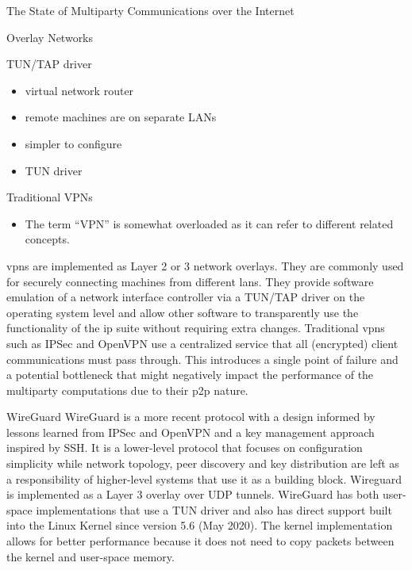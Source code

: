 \begin{frame}[fragile]{The State of Multiparty Communications over the
Internet}
\begin{block}{Overlay Networks}
\begin{block}{TUN/TAP driver}
\begin{itemize}
\begin{itemize}
    \begin{itemize}
    \tightlist
    \item
      virtual network router
    \item
      remote machines are on separate LANs
    \item
      simpler to configure
    \item
      TUN driver
    \end{itemize}
  \end{itemize}
\end{itemize}
\end{block}

\begin{block}{Traditional VPNs}
\protect\hypertarget{traditional-vpns}{}

\begin{itemize}
\tightlist
\item
  The term ``VPN'' is somewhat overloaded as it can refer to different
  related concepts.
\end{itemize}

\glspl{vpn} are implemented as Layer 2 or 3 network overlays. They are
commonly used for securely connecting machines from different
\glspl{lan}. They provide software emulation of a network interface
controller via a TUN/TAP driver on the operating system level and allow
other software to transparently use the functionality of the \gls{ip}
suite without requiring extra changes. Traditional \glspl{vpn} such as
IPSec \autocite{ipSecDocs} and OpenVPN \autocite{openVPNDocs} use a
centralized service that all (encrypted) client communications must pass
through. This introduces a single point of failure and a potential
bottleneck that might negatively impact the performance of the
multiparty computations due to their \gls{p2p} nature.
\end{block}

\begin{block}{WireGuard}
\protect\hypertarget{wireguard}{}
WireGuard \autocite{donenfeldWireGuardNextGeneration2017} is a more
recent protocol with a design informed by lessons learned from IPSec and
OpenVPN and a key management approach inspired by SSH. It is a
lower-level protocol that focuses on configuration simplicity while
network topology, peer discovery and key distribution are left as a
responsibility of higher-level systems that use it as a building block.
Wireguard is implemented as a Layer 3 overlay over UDP tunnels.
WireGuard has both user-space implementations that use a TUN driver and
also has direct support built into the Linux Kernel since version 5.6
(May 2020). The kernel implementation allows for better performance
because it does not need to copy packets between the kernel and
user-space memory.


\end{block}
\end{block}
\end{frame}
